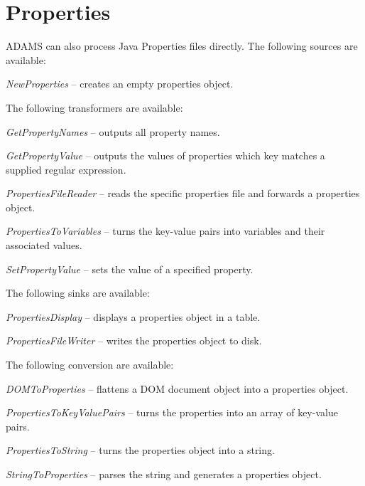 \section{Properties}
\label{properties}
ADAMS can also process Java Properties files directly.
The following sources are available:
\begin{tight_itemize}
	\item \textit{NewProperties} -- creates an empty properties object.
\end{tight_itemize}
The following transformers are available:
\begin{tight_itemize}
	\item \textit{GetPropertyNames} -- outputs all property names.
	\item \textit{GetPropertyValue} -- outputs the values of properties
	which key matches a supplied regular expression.
	\item \textit{PropertiesFileReader} -- reads the specific properties file 
	and forwards a properties object.
	\item \textit{PropertiesToVariables} -- turns the key-value pairs into
	 variables and their associated values.
	\item \textit{SetPropertyValue} -- sets the value of a specified property.
\end{tight_itemize}
The following sinks are available:
\begin{tight_itemize}
	\item \textit{PropertiesDisplay} -- displays a properties object in a table.
	\item \textit{PropertiesFileWriter} -- writes the properties object to disk.
\end{tight_itemize}
The following conversion are available:
\begin{tight_itemize}
	\item \textit{DOMToProperties} -- flattens a DOM document object into a 
	properties object.
	\item \textit{PropertiesToKeyValuePairs} -- turns the properties into an
	array of key-value pairs.
	\item \textit{PropertiesToString} -- turns the properties object into a string.
	\item \textit{StringToProperties} -- parses the string and generates a properties object.
\end{tight_itemize}

\newpage

